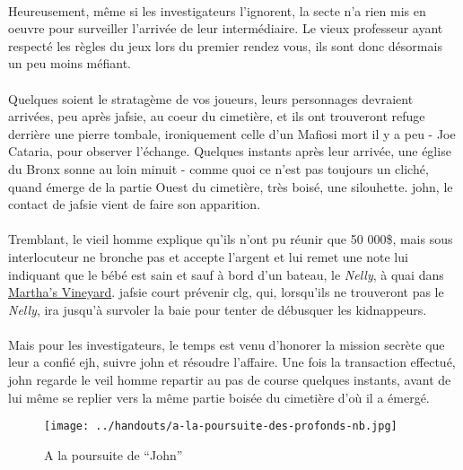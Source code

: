 \paragraph{} Heureusement, même si les investigateurs l'ignorent, la secte n'a rien mis en oeuvre pour surveiller l'arrivée de 
leur intermédiaire. Le vieux professeur ayant respecté les règles du jeux lors du premier rendez vous, ils sont donc désormais un 
peu moins méfiant.

\paragraph{} Quelques soient le stratagème de vos joueurs, leurs personnages devraient arrivées, peu après \gls{jafsie}, au coeur 
du cimetière, et ils ont trouveront refuge derrière une pierre tombale, ironiquement celle d'un Mafiosi mort il y a peu - Joe Cataria, 
pour observer l'échange. Quelques instants après leur arrivée, une église du Bronx sonne au loin minuit - comme quoi ce n'est pas toujours
un cliché, quand émerge de la partie Ouest du cimetière, très boisé, une silouhette. \gls{john}, le contact de \gls{jafsie} vient de 
faire son apparition.

\paragraph{} Tremblant, le vieil homme explique qu'ils n'ont pu réunir que 50 000\$, mais sous interlocuteur ne bronche pas et accepte 
l'argent et lui remet une note lui indiquant que le bébé est sain et sauf à bord d'un bateau, le \emph{Nelly}, à quai dans 
\href{http://en.wikipedia.org/wiki/Martha\%27s\_Vineyard}{Martha's Vineyard}. \gls{jafsie} court prévenir \gls{clg}, qui, lorsqu'ils ne 
trouveront pas le \emph{Nelly}, ira jusqu'à survoler la baie pour tenter de débusquer les kidnappeurs.

\paragraph{} Mais pour les investigateurs, le temps est venu d'honorer la mission secrète que leur a confié \gls{ejh}, suivre \gls{john} et
résoudre l'affaire. Une fois la transaction effectué, \gls{john} regarde le veil homme repartir au pas de course quelques instants, avant 
de lui même se replier vers la même partie boisée du cimetière d'où il a émergé.

\begin{figure}[h]
 \begin{center}
  \texttt{[image: ../handouts/a-la-poursuite-des-profonds-nb.jpg]}
  \end{center}
\caption{A la poursuite de ``John''}
\end{figure}


